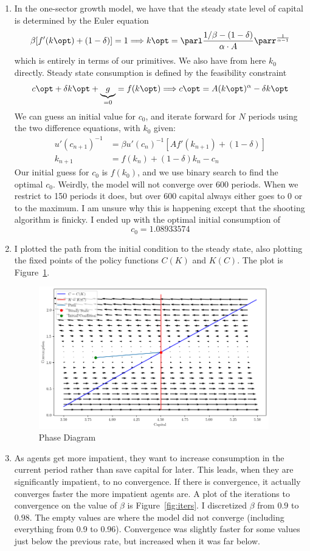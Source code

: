 \documentclass[10pt]{article}
\begin{document}
\begin{enumerate}
	\item In the one-sector growth model, we have that the steady state level of capital is determined by the Euler equation \[\beta [f'(k\opt) + (1-\delta)] = 1 \Longrightarrow k\opt = \parl\frac{1/\beta - (1-\delta)}{\alpha \cdot A}\parr^{\frac{1}{\alpha-1}} \]which is entirely in terms of our primitives. We also have from here $k_0$ directly. Steady state consumption is defined by the feasibility constraint \[c\opt + \delta k\opt + \underbrace{g}_{=0} = f(k\opt) \Longrightarrow c\opt = A(k\opt)^\alpha - \delta k\opt \]We can guess an initial value for $c_0$, and iterate forward for $N$ periods using the two difference equations, with $k_0$ given: \begin{align*} u'(c_{n+1})^{-1} &= \beta u'(c_n)^{-1}[Af'(k_{n+1})+(1-\delta)] \\ k_{n+1} &= f(k_n)+ (1-\delta)k_n - c_n\end{align*}Our initial guess for $c_0$ is $f(k_0)$, and we use binary search to find the optimal $c_0$. Weirdly, the model will not converge over 600 periods. When we restrict to 150 periods it does, but over 600 capital always either goes to 0 or to the maximum. I am unsure why this is happening except that the shooting algorithm is finicky. I ended up with the optimal initial consumption of \[c_0 = 1.08933574\]
	\item I plotted the path from the initial condition to the steady state, also plotting the fixed points of the policy functions $C(K)$ and $K(C)$. The plot is Figure~\ref{fig:phase_diagram}.
	\begin{figure}[H]
		\centering
		\includegraphics[width=10cm]{macro_hw1_code/phase_diagram.png}
		\caption{Phase Diagram}
		\label{fig:phase_diagram}
	\end{figure} 
	\item As agents get more impatient, they want to increase consumption in the current period rather than save capital for later. This leads, when they are significantly impatient, to no convergence. If there is convergence, it actually converges faster the more impatient agents are. A plot of the iterations to convergence on the value of $\beta$ is Figure~\ref{fig:iters}. I discretized $\beta$ from $0.9$ to $0.98$. The empty values are where the model did not converge (including everything from 0.9 to 0.96). Convergence was slightly faster for some values just below the previous rate, but increased when it was far below.

\end{enumerate}
\end{document}

